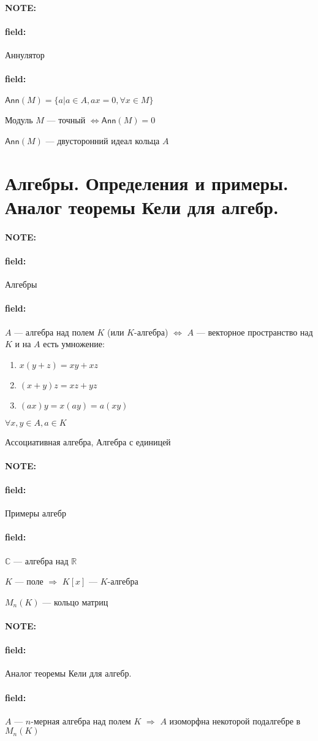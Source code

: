 \documentclass[12pt]{article}
\newenvironment{note}{\paragraph{NOTE:}}{}
\newenvironment{field}{\paragraph{field:}}{}
\begin{document}
\begin{note}
  \begin{field}
    Аннулятор
  \end{field}
  \begin{field}
    $\mathsf{Ann}(M) = \{a | a \in A, ax = 0, \forall x \in M\}$

    Модуль $M$ --- точный $\Leftrightarrow \mathsf{Ann}(M) = 0$

    $\mathsf{Ann}(M)$ --- двусторонний идеал кольца $A$
  \end{field}
\end{note}

\section{Алгебры. Определения и примеры. Аналог теоремы Кели для алгебр.}

\begin{note}
  \begin{field}
    Алгебры
  \end{field}
  \begin{field}
    $A$ --- алгебра над полем $K$ (или $K$-алгебра)
    $\Leftrightarrow$ $A$ --- векторное пространство над $K$
    и на $A$ есть умножение:
    \begin{enumerate}
      \item
      $x(y + z) = xy + xz$
      \item
      $(x + y)z = xz + yz$
      \item
      $(ax)y = x(ay) = a(xy)$
    \end{enumerate}

    $\forall x, y \in A, a \in K$

    Ассоциативная алгебра,
    Алгебра с единицей
  \end{field}
\end{note}

\begin{note}
  \begin{field}
    Примеры алгебр
  \end{field}
  \begin{field}
    $\mathbb{C}$ --- алгебра над $\mathbb{R}$

    $K$ --- поле $\Rightarrow$
    $K[x]$ --- $K$-алгебра

    $M_{n}(K)$ --- кольцо матриц
  \end{field}
\end{note}

\begin{note}
  \begin{field}
    Аналог теоремы Кели для алгебр.
  \end{field}
  \begin{field}
    $A$ --- $n$-мерная алгебра над полем $K$
    $\Rightarrow$ $A$ изоморфна некоторой подалгебре в $M_{n}(K)$
  \end{field}
\end{note}
\end{document}
